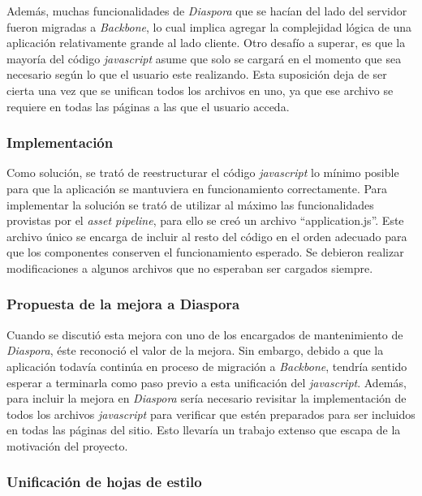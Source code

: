 Además, muchas funcionalidades de \emph{Diaspora} que se hacían del lado del servidor fueron migradas a \emph{Backbone}, lo cual implica agregar la complejidad lógica de una 
aplicación relativamente grande al lado cliente. Otro desafío a superar, es que la mayoría del código \emph{javascript} asume que solo se cargará en el momento que sea necesario 
según lo que el usuario este realizando. Esta suposición deja de ser cierta una vez que se unifican todos los archivos en uno, ya que ese archivo se requiere en todas las páginas a las 
que el usuario acceda.

\subsubsection{Implementación}

Como solución, se trató de reestructurar el código \emph{javascript} lo mínimo posible para que la aplicación se mantuviera en funcionamiento correctamente. Para implementar la
solución se trató de utilizar al máximo las funcionalidades provistas por el \emph{asset pipeline}, para ello se creó un archivo ``application.js''. Este archivo único se encarga de
incluir al resto del código en el orden adecuado para que los componentes conserven el funcionamiento esperado. Se debieron realizar modificaciones a algunos
archivos que no esperaban ser cargados siempre.

\subsubsection{Propuesta de la mejora a Diaspora}

Cuando se discutió esta mejora con uno de los encargados de mantenimiento de \emph{Diaspora}, éste reconoció el valor de la mejora. Sin embargo, debido a que la aplicación 
todavía continúa en proceso de migración a \emph{Backbone}, tendría sentido esperar a terminarla como paso previo a esta unificación del \emph{javascript}. Además, para incluir la 
mejora en \emph{Diaspora} sería necesario revisitar la implementación de todos los archivos \emph{javascript} para verificar que estén preparados para ser incluidos en todas las 
páginas del sitio. Esto llevaría un trabajo extenso que escapa de la motivación del proyecto.

\subsubsection{Unificación de hojas de estilo}

